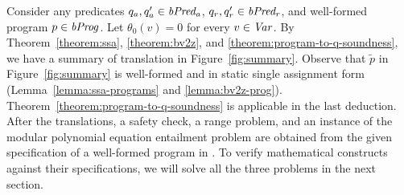 
Consider any predicates $q_a, q_a' \in \mathit{bPred_a}$, $q_r, q_r' \in \mathit{bPred_r}$, and well-formed program $p \in
\mathit{bProg}$. Let $\theta_0 (v) = 0$ for every $v \in \mathit{Var}$. By
Theorem~\ref{theorem:ssa}, \ref{theorem:bv2z}, and \ref{theorem:program-to-q-soundness}, we have a summary of translation in Figure~\ref{fig:summary}.
Observe that $\tilde{p}$ in Figure~\ref{fig:summary} is well-formed and in static single assignment
form (Lemma~\ref{lemma:ssa-programs} and \ref{lemma:bv2z-prog}).
Theorem~\ref{theorem:program-to-q-soundness} is applicable in the last
deduction. After the translations, a safety check, a range problem, and an instance of the modular
polynomial equation entailment problem are obtained from the given
specification of a well-formed program in \bvdsl.
To verify mathematical constructs against their specifications, we will solve all the three problems in the next section.

